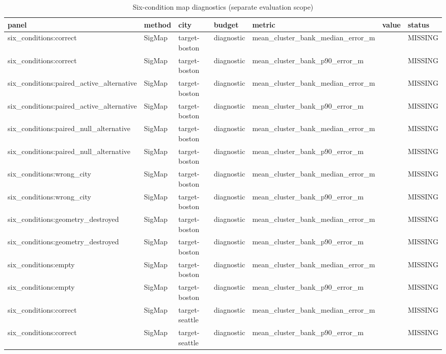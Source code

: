 \begin{longtable}{lllllll}
\caption{Six-condition map diagnostics (separate evaluation scope)}\\
\toprule
panel & method & city & budget & metric & value & status \\
\midrule\endhead
six\_conditions:correct & SigMap & target-boston & diagnostic & mean\_cluster\_bank\_median\_error\_m &  & MISSING \\
six\_conditions:correct & SigMap & target-boston & diagnostic & mean\_cluster\_bank\_p90\_error\_m &  & MISSING \\
six\_conditions:paired\_active\_alternative & SigMap & target-boston & diagnostic & mean\_cluster\_bank\_median\_error\_m &  & MISSING \\
six\_conditions:paired\_active\_alternative & SigMap & target-boston & diagnostic & mean\_cluster\_bank\_p90\_error\_m &  & MISSING \\
six\_conditions:paired\_null\_alternative & SigMap & target-boston & diagnostic & mean\_cluster\_bank\_median\_error\_m &  & MISSING \\
six\_conditions:paired\_null\_alternative & SigMap & target-boston & diagnostic & mean\_cluster\_bank\_p90\_error\_m &  & MISSING \\
six\_conditions:wrong\_city & SigMap & target-boston & diagnostic & mean\_cluster\_bank\_median\_error\_m &  & MISSING \\
six\_conditions:wrong\_city & SigMap & target-boston & diagnostic & mean\_cluster\_bank\_p90\_error\_m &  & MISSING \\
six\_conditions:geometry\_destroyed & SigMap & target-boston & diagnostic & mean\_cluster\_bank\_median\_error\_m &  & MISSING \\
six\_conditions:geometry\_destroyed & SigMap & target-boston & diagnostic & mean\_cluster\_bank\_p90\_error\_m &  & MISSING \\
six\_conditions:empty & SigMap & target-boston & diagnostic & mean\_cluster\_bank\_median\_error\_m &  & MISSING \\
six\_conditions:empty & SigMap & target-boston & diagnostic & mean\_cluster\_bank\_p90\_error\_m &  & MISSING \\
six\_conditions:correct & SigMap & target-seattle & diagnostic & mean\_cluster\_bank\_median\_error\_m &  & MISSING \\
six\_conditions:correct & SigMap & target-seattle & diagnostic & mean\_cluster\_bank\_p90\_error\_m &  & MISSING \\

\end{longtable}
